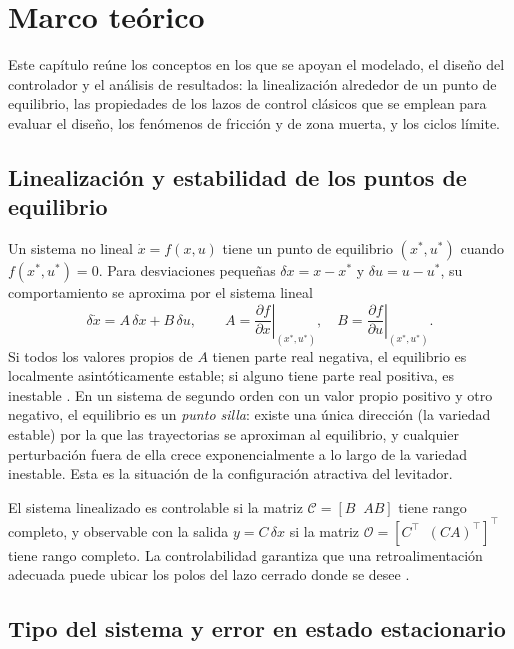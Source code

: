 \chapter{Marco teórico}\label{chap:marco}

Este capítulo reúne los conceptos en los que se apoyan el modelado, el diseño del controlador y el análisis de resultados: la linealización alrededor de un punto de equilibrio, las propiedades de los lazos de control clásicos que se emplean para evaluar el diseño, los fenómenos de fricción y de zona muerta, y los ciclos límite.

\section{Linealización y estabilidad de los puntos de equilibrio}

Un sistema no lineal $\dot{x}=f(x,u)$ tiene un punto de equilibrio $(x^*,u^*)$ cuando $f(x^*,u^*)=0$. Para desviaciones pequeñas $\delta x = x-x^*$ y $\delta u = u-u^*$, su comportamiento se aproxima por el sistema lineal
\begin{equation}
\delta\dot{x} = A\,\delta x + B\,\delta u, \qquad
A=\left.\frac{\partial f}{\partial x}\right|_{(x^*,u^*)}, \quad
B=\left.\frac{\partial f}{\partial u}\right|_{(x^*,u^*)} .
\label{eq:linealizacion}
\end{equation}
Si todos los valores propios de $A$ tienen parte real negativa, el equilibrio es localmente asintóticamente estable; si alguno tiene parte real positiva, es inestable \cite{khalil2}. En un sistema de segundo orden con un valor propio positivo y otro negativo, el equilibrio es un \emph{punto silla}: existe una única dirección (la variedad estable) por la que las trayectorias se aproximan al equilibrio, y cualquier perturbación fuera de ella crece exponencialmente a lo largo de la variedad inestable. Esta es la situación de la configuración atractiva del levitador.

El sistema linealizado es controlable si la matriz $\mathcal{C}=[B\;\; AB]$ tiene rango completo, y observable con la salida $y=C\,\delta x$ si la matriz $\mathcal{O}=[C^\top\;\; (CA)^\top]^\top$ tiene rango completo. La controlabilidad garantiza que una retroalimentación adecuada puede ubicar los polos del lazo cerrado donde se desee \cite{ogata}.

\section{Tipo del sistema y error en estado estacionario}

